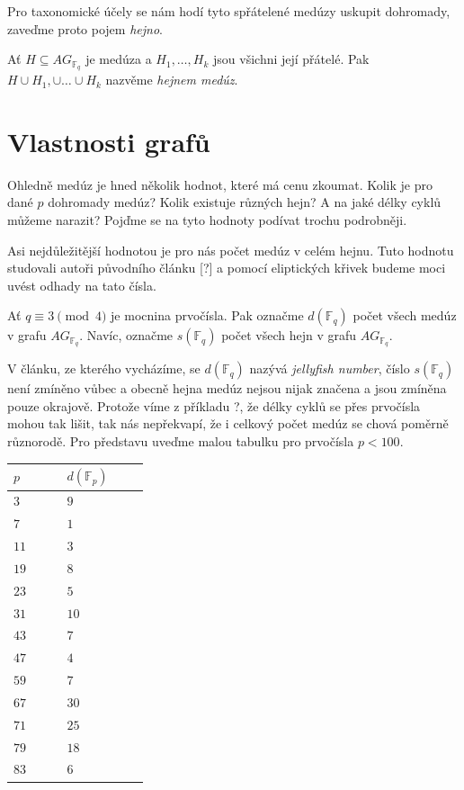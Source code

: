 \documentclass[12pt]{report}
\begin{document}
Pro taxonomické účely se nám hodí tyto spřátelené medúzy uskupit dohromady, zaveďme proto pojem \textit{hejno}.
\begin{definice}
Ať $H \subseteq AG_{\mathbb{F}_q}$ je medúza a $H_1,\dots,H_k$ jsou všichni její přátelé. Pak $H \cup H_1, \cup \dots \cup H_k$ nazvěme \textit{hejnem medúz}.
\end{definice}
 
 
\section{Vlastnosti grafů}

Ohledně medúz je hned několik hodnot, které má cenu zkoumat. Kolik je pro dané $p$ dohromady medúz? Kolik existuje různých hejn? A na jaké délky cyklů můžeme narazit? Pojďme se na tyto hodnoty podívat trochu podrobněji.

Asi nejdůležitější hodnotou je pro nás počet medúz v celém hejnu. Tuto hodnotu studovali autoři původního článku [?] a pomocí eliptických křivek budeme moci uvést odhady na tato čísla.

\begin{definice}
Ať $q \equiv 3 \pmod{4}$ je mocnina prvočísla. Pak označme $d(\mathbb{F}_q)$ počet všech medúz v grafu $AG_{\mathbb{F}_q}$. Navíc, označme $s(\mathbb{F}_q)$ počet všech hejn v grafu $AG_{\mathbb{F}_q}$.
\end{definice}
V článku, ze kterého vycházíme, se $d(\mathbb{F}_q)$ nazývá \textit{jellyfish number}, číslo $s(\mathbb{F}_q)$ není zmíněno vůbec a obecně hejna medúz nejsou nijak značena a jsou zmíněna pouze okrajově. Protože víme z příkladu ?, že délky cyklů se přes prvočísla mohou tak lišit, tak nás nepřekvapí, že i celkový počet medúz se chová poměrně různorodě. Pro představu uveďme malou tabulku pro prvočísla $p < 100$.

\begin{longtable}[H]{>{\raggedright\arraybackslash}p{0.15\linewidth}p{0.15\linewidth}}
\toprule
$p$ & $d(\mathbb{F}_p)$\\
\midrule
$3$ & \noindent $9$\\
$7$ & \noindent $1$\\
$11$ & \noindent $3$\\
$19$ & \noindent $8$\\
$23$ & \noindent $5$\\
$31$ & \noindent $10$\\
$43$ & \noindent $7$\\
$47$ & \noindent $4$\\
$59$ & \noindent $7$\\
$67$ & \noindent $30$\\
$71$ & \noindent $25$\\
$79$ & \noindent $18$\\
$83$ & \noindent $6$\\
\bottomrule 
\end{longtable}
\end{document}
